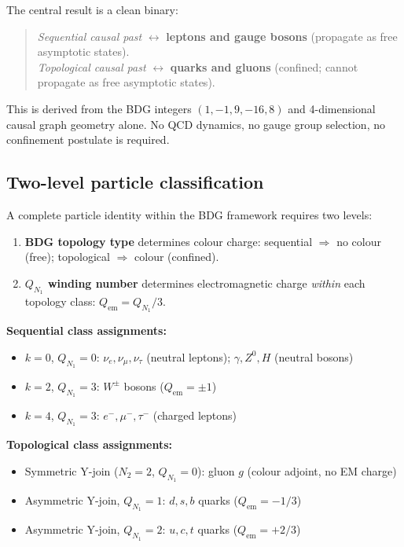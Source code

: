 \documentclass[11pt,a4paper]{article}
\begin{document}
The central result is a clean binary:
\begin{quote}
\emph{Sequential causal past} $\longleftrightarrow$ \textbf{leptons and gauge bosons}
(propagate as free asymptotic states).\\
\emph{Topological causal past} $\longleftrightarrow$ \textbf{quarks and gluons}
(confined; cannot propagate as free asymptotic states).
\end{quote}
This is derived from the BDG integers $(1,-1,9,-16,8)$ and 4-dimensional
causal graph geometry alone. No QCD dynamics, no gauge group selection,
no confinement postulate is required.

\subsection{Two-level particle classification}

A complete particle identity within the BDG framework requires two levels:

\begin{enumerate}
  \item \textbf{BDG topology type} determines colour charge:
    sequential $\Rightarrow$ no colour (free); topological $\Rightarrow$ colour (confined).
  \item \textbf{$Q_{N_1}$ winding number} determines electromagnetic charge
    \emph{within} each topology class: $Q_{\mathrm{em}} = Q_{N_1}/3$.
\end{enumerate}

\noindent\textbf{Sequential class assignments:}
\begin{itemize}[noitemsep]
  \item $k=0$, $Q_{N_1}=0$: $\nu_e, \nu_\mu, \nu_\tau$ (neutral leptons);
    $\gamma, Z^0, H$ (neutral bosons)
  \item $k=2$, $Q_{N_1}=3$: $W^{\pm}$ bosons ($Q_\mathrm{em} = \pm 1$)
  \item $k=4$, $Q_{N_1}=3$: $e^-, \mu^-, \tau^-$ (charged leptons)
\end{itemize}

\noindent\textbf{Topological class assignments:}
\begin{itemize}[noitemsep]
  \item Symmetric Y-join ($N_2=2$, $Q_{N_1}=0$): gluon $g$
    (colour adjoint, no EM charge)
  \item Asymmetric Y-join, $Q_{N_1}=1$: $d, s, b$ quarks
    ($Q_\mathrm{em} = -1/3$)
  \item Asymmetric Y-join, $Q_{N_1}=2$: $u, c, t$ quarks
    ($Q_\mathrm{em} = +2/3$)
\end{itemize}
\end{document}
